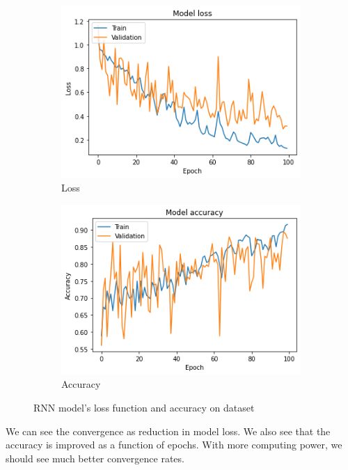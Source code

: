 \documentclass[11pt, letterpaper]{article}
\begin{document}
\begin{figure}[H]%
     \centering
     \begin{subfigure}[b]{0.45\textwidth}
         \centering
         \includegraphics[width=\textwidth]{rnn_model_loss.png}
         \caption{Loss}
         \label{fig:rnn_model_loss}
     \end{subfigure}
     \hfill
     \begin{subfigure}[b]{0.45\textwidth}
         \centering
         \includegraphics[width=\textwidth]{rnn_model_accuracy.png}
         \caption{Accuracy}
         \label{fig:modelaccuracy}
     \end{subfigure}
        \caption{RNN model's loss function and accuracy on dataset}
        \label{fig:RNN_model_loss_accuracy}
\end{figure}
We can see the convergence as reduction in model loss. We also see that the accuracy is improved as a function of epochs. With more computing power, we should see much better convergence rates.
\end{document}
